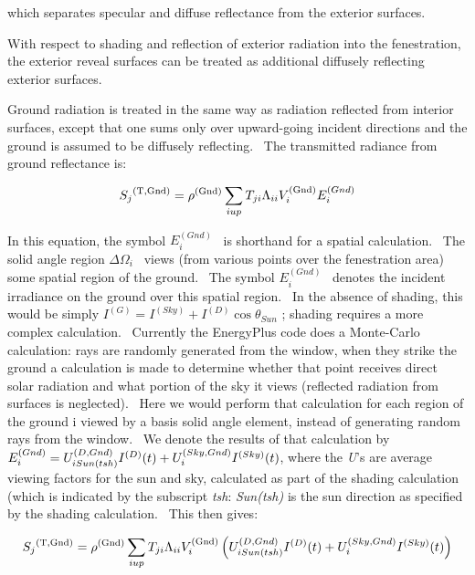 which separates specular and diffuse reflectance from the exterior surfaces.

With respect to shading and reflection of exterior radiation into the fenestration, the exterior reveal surfaces can be treated as additional diffusely reflecting exterior surfaces.

Ground radiation is treated in the same way as radiation reflected from interior surfaces, except that one sums only over upward-going incident directions and the ground is assumed to be diffusely reflecting.~ The transmitted radiance from ground reflectance is:

\begin{equation}
{S_j}^{{\rm{(T, Gnd)}}} = {\rho ^{{\rm{(Gnd)}}}}\sum\limits_{i{\rm{ }}up} {{T_{ji}}{\Lambda_{ii}}V_i^{{\rm{(Gnd)}}}E_i^{(Gnd)}}
\label{eq:SjTGndEquation}
\end{equation}

In this equation, the symbol \(E_i^{(Gnd)}\) ~is shorthand for a spatial calculation.~ The solid angle region \(\Delta {\Omega_i}\) ~views (from various points over the fenestration area) some spatial region of the ground.~ The symbol \(E_i^{(Gnd)}\) ~denotes the incident irradiance on the ground over this spatial region.~ In the absence of shading, this would be simply \({I^{(G)}} = {I^{(Sky)}} + {I^{(D)}}\cos {\theta_{Sun}}\) ; shading requires a more complex calculation.~ Currently the EnergyPlus code does a Monte-Carlo calculation: rays are randomly generated from the window, when they strike the ground a calculation is made to determine whether that point receives direct solar radiation and what portion of the sky it views (reflected radiation from surfaces is neglected).~ Here we would perform that calculation for each region of the ground i viewed by a basis solid angle element, instead of generating random rays from the window.~ We denote the results of that calculation by \(E_i^{(Gnd)} = U_{i{\rm{ }}Sun(tsh)}^{(D,Gnd)}{I^{(D)}}(t) + U_i^{(Sky,Gnd)}{I^{(Sky)}}(t)\), where the \emph{U}'s are average viewing factors for the sun and sky, calculated as part of the shading calculation (which is indicated by the subscript \emph{tsh}: \emph{Sun(tsh)} is the sun direction as specified by the shading calculation.~ This then gives:

\begin{equation}
{S_j}^{{\rm{(T, Gnd)}}} = {\rho ^{{\rm{(Gnd)}}}}\sum\limits_{i{\rm{ }}up} {{T_{ji}}{\Lambda_{ii}}V_i^{{\rm{(Gnd)}}}\left( {U_{i{\rm{ }}Sun(tsh)}^{(D,Gnd)}{I^{(D)}}(t) + U_i^{(Sky,Gnd)}{I^{(Sky)}}(t)} \right)}
\end{equation}


